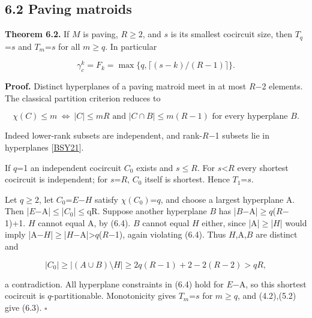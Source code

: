 \documentclass[11pt]{article}
\begin{document}
\subsection*{6.2 Paving matroids}

\textbf{Theorem 6.2.} If \(M\) is paving, \(R\ge2\), and \(s\) is its smallest cocircuit size, then \(T_q\)=\(s\) and \(T_m\)=\(s\) for all \(m\ge q\). In particular

\[
\gamma_c^k=F_k=\max\{q,\lceil(s-k)/(R-1)\rceil\}.       \tag{6.3}
\]

\textbf{Proof.} Distinct hyperplanes of a paving matroid meet in at most \(R\)\ensuremath{-}2 elements. The classical partition criterion reduces to

\[
\chi(C)\le m\ \Longleftrightarrow\ |C|\le mR
\text{ and }|C\cap B|\le m(R-1)\text{ for every hyperplane }B.       \tag{6.4}
\]

Indeed lower-rank subsets are independent, and rank-\(R\)\ensuremath{-}1 subsets lie in hyperplanes [\hyperlink{refBSY21}{BSY21}].

If \(q\)=1 an independent cocircuit \(C_0\) exists and \(s\le R\). For \(s\)<\(R\) every shortest cocircuit is independent; for \(s\)=\(R\), \(C_0\) itself is shortest. Hence \(T_1\)=\(s\).

Let \(q\ge2\), let \(C_0\)=\(E\)\ensuremath{-}\(H\) satisfy \(\chi(C_0)\)=\(q\), and choose a largest hyperplane A. Then |\(E\)\ensuremath{-}A|\(\le\)|\(C_0\)|\(\le\)qR. Suppose another hyperplane \(B\) has |\(B\)\ensuremath{-}A|\(\ge\)\(q\)(\(R\)\ensuremath{-}1)+1. \(H\) cannot equal A, by (6.4). \(B\) cannot equal \(H\) either, since |A|\(\ge\)|\(H\)| would imply |A\ensuremath{-}\(H\)|\(\ge\)|\(H\)\ensuremath{-}A|>\(q\)(\(R\)\ensuremath{-}1), again violating (6.4). Thus \(H\),A,\(B\) are distinct and

\[
|C_0|\ge |(A\cup B)\setminus H|
\ge 2q(R-1)+2-2(R-2)>qR,
\]

a contradiction. All hyperplane constraints in (6.4) hold for \(E\)\ensuremath{-}A, so this shortest cocircuit is \(q\)-partitionable. Monotonicity gives \(T_m\)=\(s\) for \(m\ge q\), and (4.2),(5.2) give (6.3). \hfill\ensuremath{\square}
\end{document}
